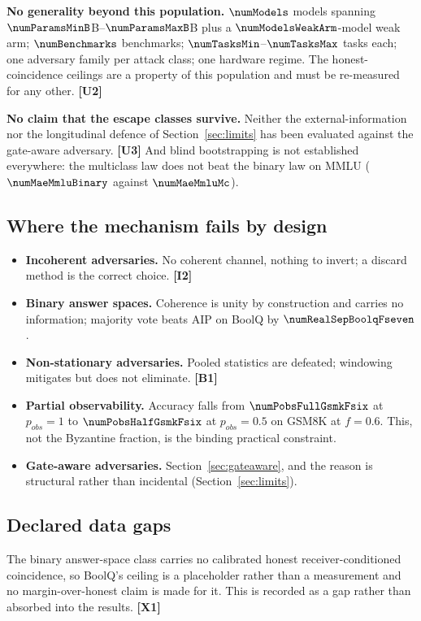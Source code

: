 \textbf{No generality beyond this population.} $\numModels$ models spanning
$\numParamsMinB$B--$\numParamsMaxB$B plus a $\numModelsWeakArm$-model weak arm;
$\numBenchmarks$ benchmarks; $\numTasksMin$--$\numTasksMax$ tasks each; one
adversary family per attack class; one hardware regime. The honest-coincidence
ceilings are a property of this population and must be re-measured for any other.
\textbf{[U2]}

\textbf{No claim that the escape classes survive.} Neither the
external-information nor the longitudinal defence of Section~\ref{sec:limits} has
been evaluated against the gate-aware adversary. \textbf{[U3]} And blind
bootstrapping is not established everywhere: the multiclass law does not beat the
binary law on MMLU ($\numMaeMmluBinary$ against $\numMaeMmluMc$).

\subsection{Where the mechanism fails by design}

\begin{itemize}
\item \textbf{Incoherent adversaries.} No coherent channel, nothing to invert; a
      discard method is the correct choice. \textbf{[I2]}
\item \textbf{Binary answer spaces.} Coherence is unity by construction and
      carries no information; majority vote beats AIP on BoolQ by
      $\numRealSepBoolqFseven$.
\item \textbf{Non-stationary adversaries.} Pooled statistics are defeated;
      windowing mitigates but does not eliminate. \textbf{[B1]}
\item \textbf{Partial observability.} Accuracy falls from
      $\numPobsFullGsmkFsix$ at $p_{obs}=1$ to $\numPobsHalfGsmkFsix$ at
      $p_{obs}=0.5$ on GSM8K at $f=0.6$. This, not the Byzantine fraction, is the
      binding practical constraint.
\item \textbf{Gate-aware adversaries.} Section~\ref{sec:gateaware}, and the
      reason is structural rather than incidental (Section~\ref{sec:limits}).
\end{itemize}

\subsection{Declared data gaps}

The binary answer-space class carries no calibrated honest receiver-conditioned
coincidence, so BoolQ's ceiling is a placeholder rather than a measurement and no
margin-over-honest claim is made for it. This is recorded as a gap rather than
absorbed into the results. \textbf{[X1]}

